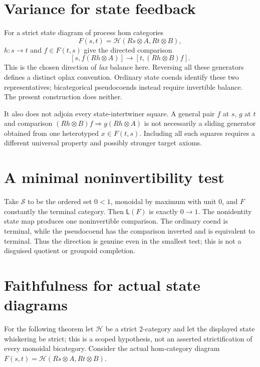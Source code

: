 \documentclass[11pt]{article}
\begin{document}
\section{Variance for state feedback}
For a strict state diagram of process hom categories
\[
 F(s,t)=\mathcal H(Rs\otimes A,Rt\otimes B),
\]
$h:s\to t$ and $f\in F(t,s)$ give the directed comparison
\[
 [s,f(Rh\otimes A)]\longrightarrow[t,(Rh\otimes B)f].
\]
This is the chosen direction of \emph{lax} balance here. Reversing all these generators defines a distinct oplax convention. Ordinary state coends identify these two representatives; bicategorical pseudocoends instead require invertible balance. The present construction does neither.

It also does not adjoin every state-intertwiner square. A general pair $f$ at $s$, $g$ at $t$ and comparison $(Rh\otimes B)f\Rightarrow g(Rh\otimes A)$ is not necessarily a sliding generator obtained from one heterotyped $x\in F(t,s)$. Including all such squares requires a different universal property and possibly stronger target axioms.

\section{A minimal noninvertibility test}
Take $\mathcal S$ to be the ordered set $0<1$, monoidal by maximum with unit $0$, and $F$ constantly the terminal category. Then $\mathsf L(F)$ is exactly $0\to1$. The nonidentity state map produces one noninvertible comparison. The ordinary coend is terminal, while the pseudocoend has the comparison inverted and is equivalent to terminal. Thus the direction is genuine even in the smallest test; this is not a disguised quotient or groupoid completion.

\section{Faithfulness for actual state diagrams}
For the following theorem let $\mathcal H$ be a strict 2-category and let the displayed state whiskering be strict; this is a scoped hypothesis, not an asserted strictification of every monoidal bicategory. Consider the actual hom-category diagram $F(s,t)=\mathcal H(Rs\otimes A,Rt\otimes B)$.
\end{document}

